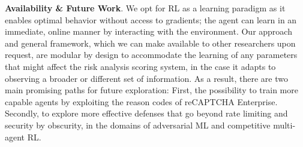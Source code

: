 \textbf{Availability \& Future Work}.
We opt for \gls{RL} as a learning paradigm as it enables optimal behavior without access to gradients; the agent can learn in an immediate, online manner by interacting with the environment.
Our approach and general framework, which we can make available to other researchers upon request, are modular by design to accommodate the learning of any parameters that might affect the risk analysis scoring system, in the case it adapts to observing a broader or different set of information.
As a result, there are two main promising paths for future exploration:
First, the possibility to train more capable agents by exploiting the reason codes of reCAPTCHA Enterprise.
Secondly, to explore more effective defenses that go beyond rate limiting and security by obscurity, in the domains of adversarial \gls{ML} and competitive multi-agent \gls{RL}.




